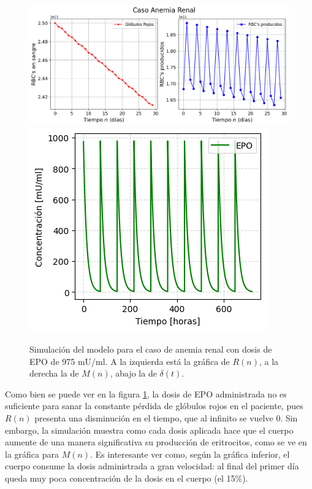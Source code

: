 \begin{figure}[H]
    \centering
    \captionsetup{justification=centering}
    \includegraphics[scale=0.534]{figures/AR11.png}
    \includegraphics[scale=0.8]{figures/AR12.png}
    \caption{Simulación del modelo para el caso de anemia renal con dosis de EPO de 975 mU/ml. A la izquierda está la gráfica de $R(n)$, a la derecha la de $M(n)$, abajo la de $\delta(t)$.}
    \label{sec:variaciones:fig:Anemia1}
\end{figure}

Como bien se puede ver en la figura \ref{sec:variaciones:fig:Anemia1}, la dosis de EPO administrada no es suficiente para sanar la constante pérdida de glóbulos rojos en el paciente, pues $R(n)$ presenta una disminución en el tiempo, que al infinito se vuelve 0. Sin embargo, la simulación muestra como cada dosis aplicada hace que el cuerpo aumente de una manera significativa su producción de eritrocitos, como se ve en la gráfica para $M(n)$. Es interesante ver como, según la gráfica inferior, el cuerpo consume la dosis administrada a gran velocidad: al final del primer día queda muy poca concentración de la dosis en el cuerpo (el 15$\%$).

